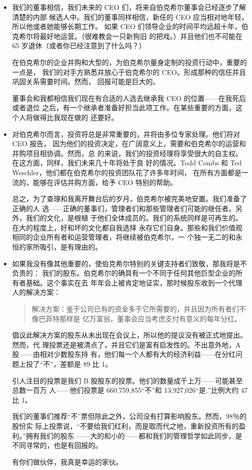 \documentclass[UTF8,a4paper,zihao=-4,fontset = windows]{ctexart} %
\begin{document}
\begin{itemize}
    \item \noindent 我们的董事相信，我们未来的 CEO 们，将来自伯克希尔董事会已经逐步了解清楚的内部
候选人中。我们的董事同样相信，新任的 CEO 应当相对地年轻，所以他或者她能够长期工作。
如果 CEO 们领导企业的时间平均远超十年，伯克希尔将最好地运营。（很难教会一只新狗旧
的把戏。）并且他们也不可能在 65 岁退休（或者你已经注意到了什么吗？）

在伯克希尔的企业并购和大型的，为伯克希尔量身定制的投资行动中，重要的一点是，
我们的对手方熟悉并放心于伯克希尔的 CEO。形成那种的信任并且巩固关系需要时间。然而，
回报可能是巨大的。

董事会和我都相信我们现在有合适的人选去继承我 CEO 的位置——在我死后或者退位
之后，有一个继承者准备好担当此项工作。在某些重要的方面，这个人将做得比我现在做的
还要好。

    \item \noindent 对伯克希尔而言，投资将总是非常重要的，并将由多位专家处理。他们将对 CEO 报告，
因为他们的投资决定，在广阔意义上，需要和伯克希尔的运营和并购项目相协调。然而，总
的来说，我们的投资经理将享受很大的自主权。在这方面，同样，我们未来几十年将处于良
好的情况。Todd Combs 和 Ted Weschler，他们都在伯克希尔的投资团队花了许多年时间，
在所有方面都是一流的，能够在评估并购方面，给予 CEO 特别的帮助。

总之，为了查理和我离开舞台后的岁月，伯克希尔被完美地安置。我们准备了正确的人
选——正确的董事们，管理者们和那些管理者们可能的继任者。另外，我们的文化，是根植
于他们全体成员的。我们的系统同样是可再生的。在大的程度上，好和坏的文化都自我选择
永存它们自身。那些和我们价值观相同的企业所有者和运营管理者，将继续被伯克希尔，一
个独一无二的和永恒的家所吸引，是有理由的。

    \item \noindent 如果我没有像其他重要的，使伯克希尔特别的关键支持者们致敬，那我将是不负责的：
我们的股东。伯克希尔的确具有一个不同于任何其他巨型企业的所有者基础。这个事实在去
年年会上被肯定地证实，那时候股东收到一个代理人的解决方案：
\begin{quote}
解决方案：鉴于公司已有的资金多于它所需要的，并且因为所有者们不像巴菲特那样是
亿万富翁，董事会应当考虑支付有意义的每年分红。
\end{quote}

倡议此解决方案的股东从未出现在会议上，所以他的提议没有被正式地提出。然而，代
理投票还是被清点了，并且它们是富有启发性的。不出意外地，A 股——由相对少数股东持
有，他们每一个人都有大的经济利益——在分红问题上投了“不”，差额是 89 比 1。

引人注目的投票是我们 B 股股东的投票。他们的数量成千上万——可能甚至总数一百万
人——他们投票是 660,759,855“不”和 13,927,026“是,”比例大约 47 比 1。

我们的董事们推荐“不”票但除此之外，公司没有打算影响股东。然而，98％的股份实
际上投票说，“不要给我们红利，而是取而代之地，重新投资所有的盈利。”拥有我们的股东
——大的和小的——都和我们的管理哲学如此同步，是不同寻常的，也是有回报的。

有你们做伙伴，我真是幸运的家伙。
\end{itemize}
\end{document}
